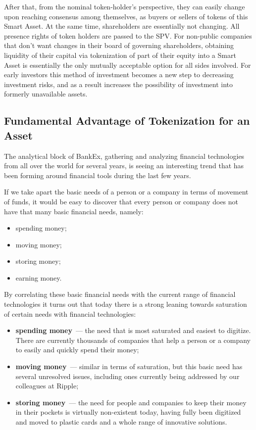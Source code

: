 \documentclass{article}
\begin{document}
\begin{multicols}{2}
After that, from the nominal token-holder’s perspective, they can easily change upon reaching consensus among themselves, as buyers or sellers of tokens of this Smart Asset. At the same time, shareholders are essentially not changing. All presence rights of token holders are passed to the SPV. For non-public companies that don’t want changes in their board of governing shareholders, obtaining liquidity of their capital via tokenization of part of their equity into a Smart Asset is essentially the only mutually acceptable option for all sides involved. 
For early investors this method of investment becomes a new step to decreasing investment risks, and as a result increases the possibility of investment into formerly unavailable assets.

\subsection{Fundamental Advantage of Tokenization for an Asset}

The analytical block of BankEx, gathering and analyzing financial technologies from all over the world for several years, is seeing an interesting trend that has been forming around financial tools during the last few years. 

If we take apart the basic needs of a person or a company in terms of movement of funds, it would be easy to discover that every person or company does not have that many basic financial needs, namely:
    
\begin{itemize}
\item spending money;
\item moving money;
\item storing money;
\item earning money.
\end{itemize}

By correlating these basic financial needs with the current range of financial technologies it turns out that today there is a strong leaning towards saturation of certain needs with financial technologies:

\begin{itemize}
\item \textbf{spending money}~--- the need that is most saturated and easiest to digitize. There are currently thousands of companies that help a person or a company to easily and quickly spend their money;
\item \textbf{moving money}~--- similar in terms of saturation, but this basic need has several unresolved issues, including ones currently being addressed by our colleagues at Ripple;
\item \textbf{storing money}~--- the need for people and companies to keep their money in their pockets is virtually non-existent today, having fully been digitized and moved to plastic cards and a whole range of innovative solutions. 
\end{itemize}


\end{multicols}
\end{document}

